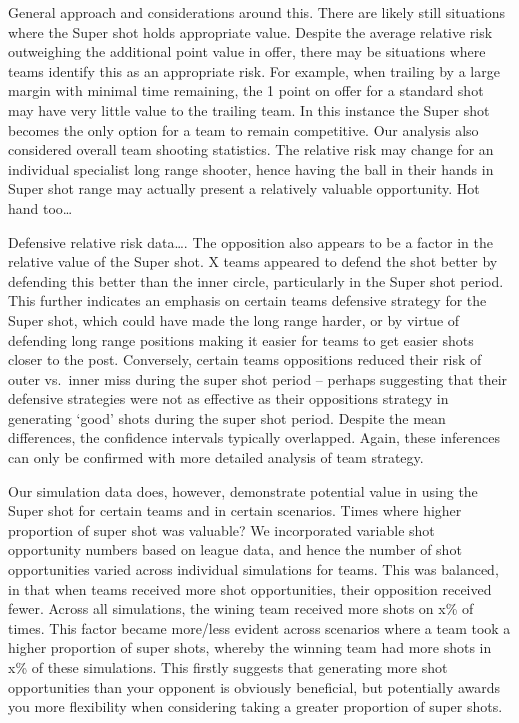 \documentclass[]{elsarticle} %
\begin{document}
General approach and considerations around this. There are likely still
situations where the Super shot holds appropriate value. Despite the
average relative risk outweighing the additional point value in offer,
there may be situations where teams identify this as an appropriate
risk. For example, when trailing by a large margin with minimal time
remaining, the 1 point on offer for a standard shot may have very little
value to the trailing team. In this instance the Super shot becomes the
only option for a team to remain competitive. Our analysis also
considered overall team shooting statistics. The relative risk may
change for an individual specialist long range shooter, hence having the
ball in their hands in Super shot range may actually present a
relatively valuable opportunity. Hot hand too\ldots{}

Defensive relative risk data\ldots. The opposition also appears to be a
factor in the relative value of the Super shot. X teams appeared to
defend the shot better by defending this better than the inner circle,
particularly in the Super shot period. This further indicates an
emphasis on certain teams defensive strategy for the Super shot, which
could have made the long range harder, or by virtue of defending long
range positions making it easier for teams to get easier shots closer to
the post. Conversely, certain teams oppositions reduced their risk of
outer vs.~inner miss during the super shot period -- perhaps suggesting
that their defensive strategies were not as effective as their
oppositions strategy in generating `good' shots during the super shot
period. Despite the mean differences, the confidence intervals typically
overlapped. Again, these inferences can only be confirmed with more
detailed analysis of team strategy.

Our simulation data does, however, demonstrate potential value in using
the Super shot for certain teams and in certain scenarios. Times where
higher proportion of super shot was valuable? We incorporated variable
shot opportunity numbers based on league data, and hence the number of
shot opportunities varied across individual simulations for teams. This
was balanced, in that when teams received more shot opportunities, their
opposition received fewer. Across all simulations, the wining team
received more shots on x\% of times. This factor became more/less
evident across scenarios where a team took a higher proportion of super
shots, whereby the winning team had more shots in x\% of these
simulations. This firstly suggests that generating more shot
opportunities than your opponent is obviously beneficial, but
potentially awards you more flexibility when considering taking a
greater proportion of super shots.
\end{document}
